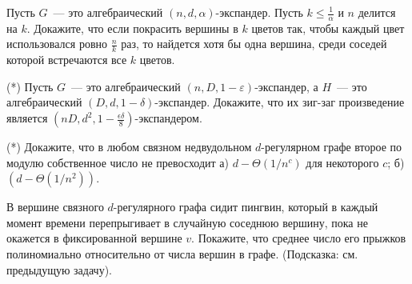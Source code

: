 \begin{ptask}{7}
    Пусть $G$~--- это алгебраический $(n,d,\alpha)$-экспандер. Пусть 
	$k\le \frac{1}{\alpha}$ и $n$ делится на $k$. Докажите, что если покрасить
    вершины  в $k$ цветов так, чтобы каждый цвет использовался ровно $\frac{n}{k}$
	раз, то найдется хотя бы одна вершина, среди соседей которой встречаются все $k$
    цветов.
\end{ptask}


\begin{ptask}{9}(*)
	Пусть $G$~--- это алгебраический $(n, D, 1 - \varepsilon)$-экспандер, а $H$~---
    это алгебраический $(D, d, 1 - \delta)$-экспандер. Докажите, что их зиг-заг
    произведение является $(nD, d^2, 1 - \frac{\epsilon \delta}{8})$-экспандером.
\end{ptask}

\begin{ptask}{10}(*)
	Докажите, что в любом связном недвудольном $d$-регулярном графе второе по модулю
	собственное число не превосходит а) $d - \Theta(1 / n^c)$ для некоторого $c$;
	б) $(d - \Theta(1 / n^2))$.
\end{ptask}

\begin{ptask}{11}
	В вершине связного $d$-регулярного графа сидит пингвин, который в каждый момент
	времени перепрыгивает в случайную соседнюю вершину, пока не окажется в
    фиксированной вершине $v$. Покажите, что среднее число его прыжков полиномиально
    относительно от числа вершин в графе. (Подсказка: см. предыдущую задачу).
\end{ptask}